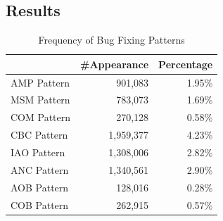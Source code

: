\documentclass{sig-alternate-05-2015}
\begin{document}
\subsection{Results} \label{sec:freqfixpattern}

\begin{table}[!htb]
	\centering
	\begin{tabular}{lrr} 
		\hline
		& \textbf{\#Appearance} & \textbf{Percentage}\\
		\hline
		AMP Pattern & 901,083 & 1.95\%\\
		MSM Pattern & 783,073 & 1.69\%\\
		COM Pattern & 270,128 & 0.58\%\\ 
		CBC Pattern & 1,959,377 & 4.23\%\\  
		IAO Pattern & 1,308,006 & 2.82\%\\  
		ANC Pattern & 1,340,561 & 2.90\%\\  
		AOB Pattern & 128,016 & 0.28\%\\  
		COB Pattern & 262,915 & 0.57\%\\   
		\hline
	\end{tabular}
	\caption{Frequency of Bug Fixing Patterns}\label{tab:freqpattern}
	
\end{table}
\end{document}
